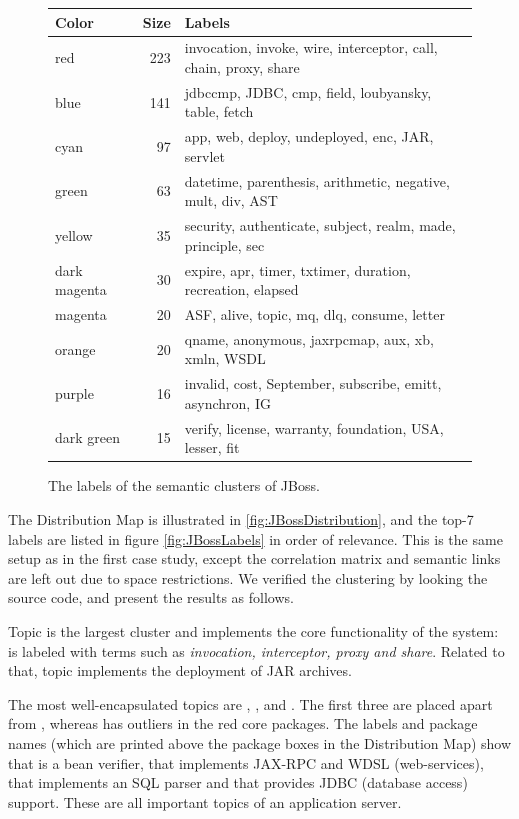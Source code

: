 \begin{figure}[h]
  \centering
  \begin{scriptsize}
  \begin{tabular}{l|rl}
    \hline
    \textbf{Color} & \textbf{Size} & \textbf{Labels}\\
    \hline
    red & 223 & invocation, invoke, wire, interceptor, call, chain, proxy, share\\
    blue & 141 & jdbccmp, JDBC, cmp, field, loubyansky, table, fetch\\
    cyan & 97 & app, web, deploy, undeployed, enc, JAR, servlet\\
    green & 63 & datetime, parenthesis, arithmetic, negative, mult, div, AST\\
    yellow & 35 & security, authenticate, subject, realm, made, principle, sec\\
    dark magenta & 30 & expire, apr, timer, txtimer, duration, recreation, elapsed\\
    magenta & 20 & ASF, alive, topic, mq, dlq, consume, letter\\
    orange & 20 & qname, anonymous, jaxrpcmap, aux, xb, xmln, WSDL\\
    purple & 16 & invalid, cost, September, subscribe, emitt, asynchron, IG\\
    dark green & 15 & verify, license, warranty, foundation, USA, lesser, fit\\
    \hline
  \end{tabular}
  \end{scriptsize}
  \caption{The labels of the semantic clusters of JBoss.}\label{fig:JBossLabels}
\end{figure}


The Distribution Map is illustrated in \autoref{fig:JBossDistribution}, and the top-7 labels are listed in figure \autoref{fig:JBossLabels} in order of relevance. This is the same setup as in the first case study, except the correlation matrix and semantic links are left out due to space restrictions. We verified the clustering by looking the source code, and present the results as follows.

Topic \red is the largest cluster and implements the core functionality of the system: is labeled with terms such as \emph{invocation, interceptor, proxy \emph{and} share}. Related to that, topic \cyan implements the deployment of JAR archives.

The most well-encapsulated topics are \darkgreen, \orange, \green and \blue. The first three are placed apart from \red, whereas \blue has outliers in the red core packages. The labels and package names (which are printed above the package boxes in the Distribution Map) show that \darkgreen is a bean verifier, that \orange implements JAX-RPC and WDSL (\eg web-services), that \green implements an SQL parser and that \blue provides JDBC (\eg database access) support. These are all important topics of an application server.

